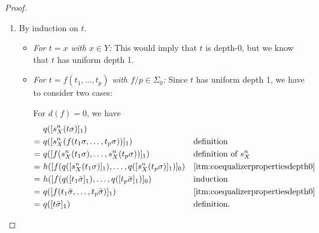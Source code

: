 \documentclass[11pt,a4paper]{amsart}
\newcommand{\sigp}{\Sigma_0}
\theoremstyle{plain}
\numberwithin{equation}{section}
\newcommand{\+}[1]{\mathcal{#1}\xspace}
\theoremstyle{definition}
\begin{document}
\begin{proof}
\begin{enumerate}[wide]
\begin{itemize}
\begin{align*}
                    \end{align*}
                    where $(\star)$ follows from $(Q, h)$ being an $M_0$-algebra.
                \item
                    \textit{For \(t = a.f(t_1, \ldots, t_p)\) and \(t = \nu a.f(t_1, \ldots, t_p)\):}
                    Analogous to the previous case.
            \end{itemize}
        \item
            By induction on \(t\).
            \begin{itemize}
                \item
                    \textit{For \(t = x\) with \(x \in Y\):}
                    This would imply that \(t\) is depth-0, but we know that \(t\) has uniform depth 1.
                \item
                    \textit{For \(t = f(t_1, \ldots, t_p)\) with \(f/p \in \sigp\):}
                    Since \(t\) has uniform depth 1, we have to consider two cases:

                    For \(d(f) = 0\), we have
                    \begin{align*}
                        &q([s^n_X(t\sigma)]_1) \\
                        =~&q([s^n_X(f(t_1\sigma, \ldots, t_p\sigma))]_1) && \text{definition} \\
                        =~&q([f(s^n_X(t_1\sigma), \ldots, s^n_X(t_p\sigma))]_1) && \text{definition of } s^n_X \\
                        =~&h([f(q([s^n_X(t_1\sigma)]_1), \ldots, q([s^n_X(t_p\sigma)]_1)]_0) && \text{\eqref{itm:coequalizerpropertiesdepth0}} \\
                        =~&h([f(q([t_1\bar{\sigma}]_1), \ldots, q([t_p\bar{\sigma}]_1)]_0) && \text{induction} \\
                        =~&q([f(t_1\bar{\sigma}, \ldots, t_p\bar{\sigma})]_1) && \text{\eqref{itm:coequalizerpropertiesdepth0}} \\
                        =~&q([t\bar{\sigma}]_1) && \text{definition}.
                    \end{align*}


\end{itemize}
\end{enumerate}
\end{proof}
\end{document}
